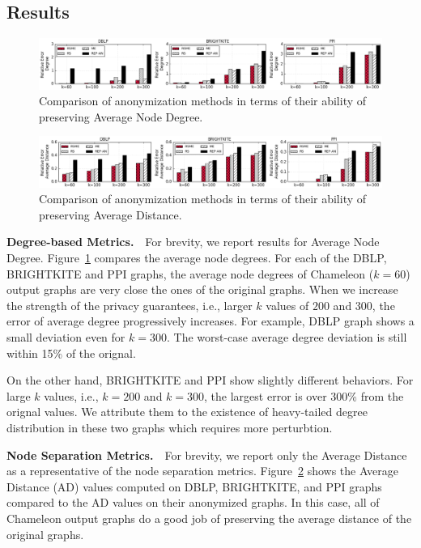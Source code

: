 \subsection{Results}
\begin{figure}[!tb]
    \centering
    \includegraphics[width=\linewidth]{exp/ex_degree.eps}
    \caption{Comparison of anonymization methods in terms of their ability of preserving Average Node Degree.}
    \label{fig:ex_degree}
\end{figure}


\begin{figure}[!tb]
    \centering
    \includegraphics[width=\linewidth]{exp/ex_apd.eps}
    \caption{Comparison of anonymization methods in terms of their ability of preserving Average Distance.}
    \label{fig:ex_apd}
\end{figure}

\textbf{Degree-based Metrics.}~~For brevity, we report results for  Average Node Degree. 
Figure~\ref{fig:ex_degree} compares the average node degrees. For each of the DBLP, BRIGHTKITE and PPI graphs, the average node degrees of Chameleon ($k=60$) output graphs are very close the ones of the original graphs. When we increase the strength of the privacy guarantees, i.e., larger $k$ values of $200$ and $300$, the error of average degree progressively increases. For example, DBLP graph shows a small deviation even for $k=300$. The worst-case average degree deviation is still within 15\% of the orignal. 

On the other hand, BRIGHTKITE and PPI show slightly different behaviors. For large $k$ values, i.e., $k=200$ and $k=300$, the largest error is over 300\% from the orignal values. We attribute them to the existence of heavy-tailed degree distribution in these two graphs which requires more perturbtion. 


\textbf{Node Separation Metrics.}~~For brevity, we report only the Average Distance as a representative of the node separation metrics. Figure~\ref{fig:ex_apd} shows the Average Distance (AD) values computed on DBLP, BRIGHTKITE, and PPI graphs compared to the AD values on their anonymized graphs. In this case, all of Chameleon output graphs do a good job of preserving the average distance of the original graphs. 



